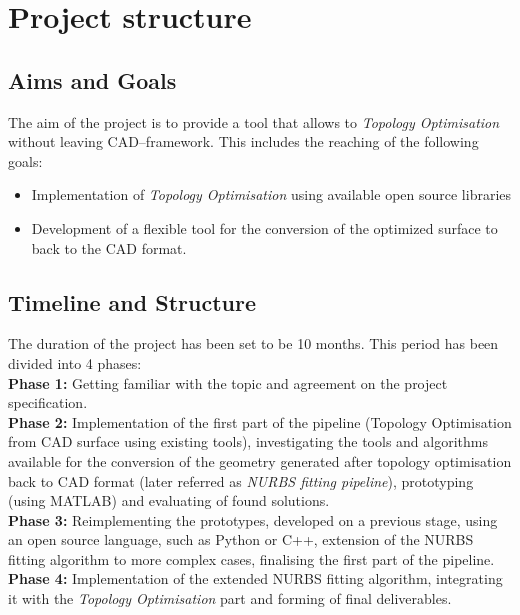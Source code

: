 \section{Project structure}
\subsection{Aims and Goals}
The aim of the project is to provide a tool that allows to \textit{Topology Optimisation} without leaving CAD--framework. This includes the reaching of the following goals:
\begin{itemize}
\item Implementation of \textit{Topology Optimisation} using available open source libraries
\item Development of a flexible tool for the conversion of the optimized surface to back to the CAD format.
\end{itemize}
\subsection{Timeline and Structure}
The duration of the project has been set to be 10 months. This period has been divided into 4 phases:\\

\textbf{Phase 1:} Getting familiar with the topic and agreement on the project specification.\\

\textbf{Phase 2:} Implementation of the first part of the pipeline (Topology Optimisation from CAD surface using existing tools), investigating the tools and algorithms available for the conversion of the geometry generated after topology optimisation back to CAD format (later referred as \textit{NURBS fitting pipeline}), prototyping (using MATLAB) and evaluating of found solutions.\\

\textbf{Phase 3:} Reimplementing the prototypes, developed on a previous stage, using an open source language, such as Python or C++, extension of the NURBS fitting algorithm to more complex cases, finalising the first part of the pipeline.\\

\textbf{Phase 4:} Implementation of the extended NURBS fitting algorithm, integrating it with the \textit{Topology Optimisation} part and forming of final deliverables.

